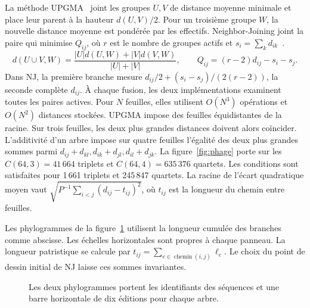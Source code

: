 La méthode UPGMA~\cite{upgma} joint les groupes \(U,V\) de distance moyenne minimale et place leur parent à la hauteur \(d(U,V)/2\). Pour un troisième groupe \(W\), la nouvelle distance moyenne est pondérée par les effectifs. Neighbor-Joining joint la paire qui minimise \(Q_{ij}\), où \(r\) est le nombre de groupes actifs et \(s_i=\sum_k d_{ik}\)~\cite{nj}.
\[
 d(U\cup V,W)=\frac{|U|d(U,W)+|V|d(V,W)}{|U|+|V|},\qquad
 Q_{ij}=(r-2)d_{ij}-s_i-s_j.
\]
Dans NJ, la première branche mesure \(d_{ij}/2+(s_i-s_j)/(2(r-2))\), la seconde complète \(d_{ij}\). À chaque fusion, les deux implémentations examinent toutes les paires actives. Pour \(N\) feuilles, elles utilisent \(O(N^3)\) opérations et \(O(N^2)\) distances stockées. UPGMA impose des feuilles équidistantes de la racine. Sur trois feuilles, les deux plus grandes distances doivent alors coïncider. L'additivité d'un arbre impose sur quatre feuilles l'égalité des deux plus grandes sommes parmi \(d_{ij}+d_{kl},d_{ik}+d_{jl},d_{il}+d_{jk}\).
La figure~\ref{fig:phage} porte sur les \(C(64,3)=41\,664\) triplets et \(C(64,4)=635\,376\) quartets. Les conditions sont satisfaites pour 1\,661 triplets et 245\,847 quartets. La racine de l'écart quadratique moyen vaut \(\sqrt{P^{-1}\sum_{i<j}(d_{ij}-t_{ij})^2}\), où \(t_{ij}\) est la longueur du chemin entre feuilles.

Les phylogrammes de la figure~\ref{fig:arbres} utilisent la longueur cumulée des branches comme abscisse. Les échelles horizontales sont propres à chaque panneau. La longueur patristique se calcule par \(t_{ij}=\sum_{e\in\operatorname{chemin}(i,j)}\ell_e\). Le choix du point de dessin initial de NJ laisse ces sommes invariantes.
\begin{figure}[H]\centering
\resizebox{!}{.68\textheight}{}
\caption{Les deux phylogrammes portent les identifiants des séquences et une barre horizontale de dix éditions pour chaque arbre.}\label{fig:arbres}
\end{figure}

